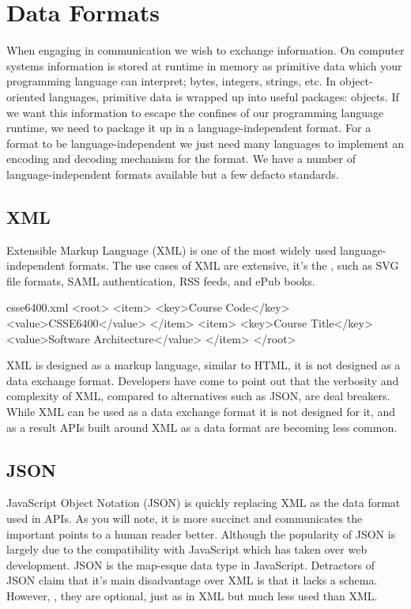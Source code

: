 \documentclass{csse4400}
\begin{document}
\section{Data Formats}
When engaging in communication we wish to exchange information.
On computer systems information is stored at runtime in memory as primitive data which your programming language can interpret;
bytes, integers, strings, etc.
In object-oriented languages,
primitive data is wrapped up into useful packages: objects.
If we want this information to escape the confines of our programming language runtime,
we need to package it up in a language-independent format.
For a format to be language-independent we just need many languages to implement an encoding and decoding mechanism for the format.
We have a number of language-independent formats available but a few defacto standards.

\subsection{XML}
Extensible Markup Language (XML) is one of the most widely used language-independent formats.
The use cases of XML are extensive,
it's the ,
such as SVG file formats, SAML authentication, RSS feeds, and ePub books.

\begin{code}[language=xml]{csse6400.xml}
<root>
  <item>
    <key>Course Code</key>
    <value>CSSE6400</value>
  </item>
  <item>
    <key>Course Title</key>
    <value>Software Architecture</value>
  </item>
</root>
\end{code}

XML is designed as a markup language, similar to HTML,
it is not designed as a data exchange format.
Developers have come to point out that the verbosity and complexity of XML,
compared to alternatives such as JSON, are deal breakers.
While XML can be used as a data exchange format it is not designed for it,
and as a result APIs built around XML as a data format are becoming less common.

\subsection{JSON}
JavaScript Object Notation (JSON) is quickly replacing XML as the data format used in APIs.
As you will note, it is more succinct and communicates the important points to a human reader better.
Although the popularity of JSON is largely due to the compatibility with JavaScript which has taken over web development.
JSON is the map-esque data type in JavaScript.
Detractors of JSON claim that it's main disadvantage over XML is that it lacks a schema.
However, ,
they are optional,
just as in XML but much less used than XML.
\end{document}
